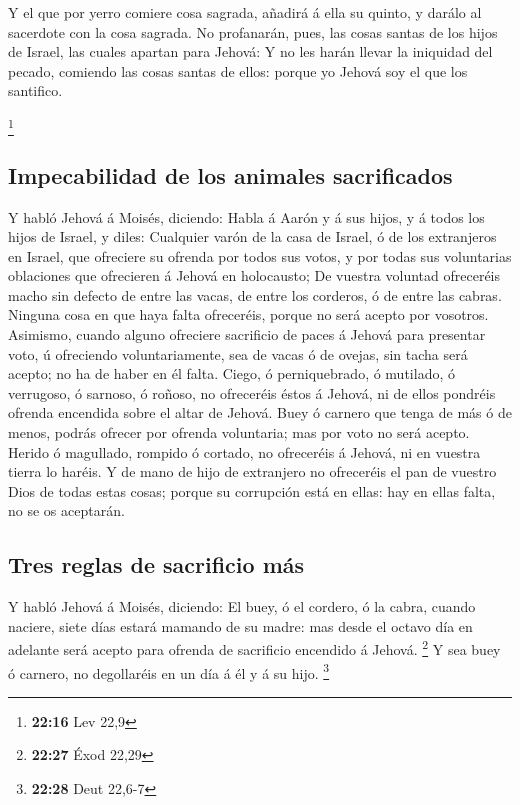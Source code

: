  Y el que por yerro comiere cosa sagrada, añadirá á ella su
quinto, y darálo al sacerdote con la cosa sagrada.  No
profanarán, pues, las cosas santas de los hijos de Israel, las cuales
apartan para Jehová:  Y no les harán llevar la iniquidad
del pecado, comiendo las cosas santas de ellos: porque yo Jehová soy el
que los santifico.

\footnote{\textbf{22:16} Lev 22,9}

\hypertarget{impecabilidad-de-los-animales-sacrificados}{%
\subsection{Impecabilidad de los animales
sacrificados}\label{impecabilidad-de-los-animales-sacrificados}}

 Y habló Jehová á Moisés, diciendo:  Habla á
Aarón y á sus hijos, y á todos los hijos de Israel, y diles: Cualquier
varón de la casa de Israel, ó de los extranjeros en Israel, que
ofreciere su ofrenda por todos sus votos, y por todas sus voluntarias
oblaciones que ofrecieren á Jehová en holocausto;  De
vuestra voluntad ofreceréis macho sin defecto de entre las vacas, de
entre los corderos, ó de entre las cabras.  Ninguna cosa en
que haya falta ofreceréis, porque no será acepto por vosotros.
 Asimismo, cuando alguno ofreciere sacrificio de paces á
Jehová para presentar voto, ú ofreciendo voluntariamente, sea de vacas ó
de ovejas, sin tacha será acepto; no ha de haber en él falta.
 Ciego, ó perniquebrado, ó mutilado, ó verrugoso, ó
sarnoso, ó roñoso, no ofreceréis éstos á Jehová, ni de ellos pondréis
ofrenda encendida sobre el altar de Jehová.  Buey ó carnero
que tenga de más ó de menos, podrás ofrecer por ofrenda voluntaria; mas
por voto no será acepto.  Herido ó magullado, rompido ó
cortado, no ofreceréis á Jehová, ni en vuestra tierra lo haréis.
 Y de mano de hijo de extranjero no ofreceréis el pan de
vuestro Dios de todas estas cosas; porque su corrupción está en ellas:
hay en ellas falta, no se os aceptarán.

\hypertarget{tres-reglas-de-sacrificio-muxe1s}{%
\subsection{Tres reglas de sacrificio
más}\label{tres-reglas-de-sacrificio-muxe1s}}

 Y habló Jehová á Moisés, diciendo:  El buey,
ó el cordero, ó la cabra, cuando naciere, siete días estará mamando de
su madre: mas desde el octavo día en adelante será acepto para ofrenda
de sacrificio encendido á Jehová. \footnote{\textbf{22:27} Éxod 22,29}
 Y sea buey ó carnero, no degollaréis en un día á él y á su
hijo. \footnote{\textbf{22:28} Deut 22,6-7}

